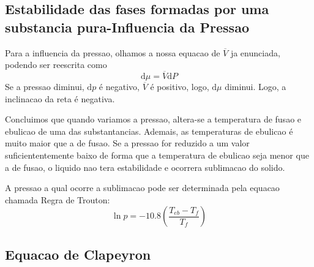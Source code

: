 \subsection{Estabilidade das fases formadas por uma substancia pura-Influencia da Pressao}
Para a influencia da pressao, olhamos a nossa equacao de \(\overline{V} \) ja enunciada, podendo ser
reescrita como
\begin{equation}
    \mathrm{d} \mu = \overline{V} \mathrm{d}P
\end{equation}
Se a pressao diminui, \(\mathrm{d}p \) é negativo, \(\overline{V} \) é positivo, logo,
\(\mathrm{d}\mu \) diminui. Logo, a inclinacao da reta é negativa. \par
Concluimos que quando variamos a pressao, altera-se a temperatura de fusao e ebulicao de uma das
substantancias. Ademais, as temperaturas de ebulicao é muito maior que a de fusao. Se a pressao for
reduzido a um valor suficiententemente baixo de forma que a temperatura de ebulicao seja menor que a
de fusao, o liquido nao tera estabilidade e ocorrera sublimacao do solido. \par

A pressao a qual ocorre a sublimacao pode ser determinada pela equacao chamada Regra de Trouton:
\begin{equation}
    \ln p = -10.8 \left( \frac{T_{eb} -T_{f}}{T_{f}} \right)
\end{equation}
\subsection{Equacao de Clapeyron} 


